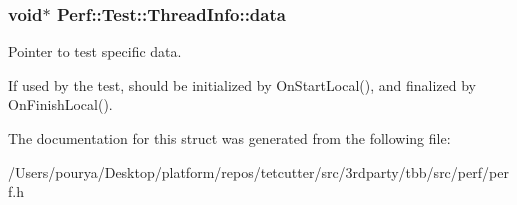 \subsubsection[{data}]{\setlength{\rightskip}{0pt plus 5cm}void$\ast$ Perf\+::\+Test\+::\+Thread\+Info\+::data}\label{structPerf_1_1Test_1_1ThreadInfo_ae97b688f7633aadc49feecfc9d0e6425}


Pointer to test specific data. 

If used by the test, should be initialized by On\+Start\+Local(), and finalized by On\+Finish\+Local(). 

The documentation for this struct was generated from the following file\+:\begin{DoxyCompactItemize}
\item 
/\+Users/pourya/\+Desktop/platform/repos/tetcutter/src/3rdparty/tbb/src/perf/perf.\+h\end{DoxyCompactItemize}
